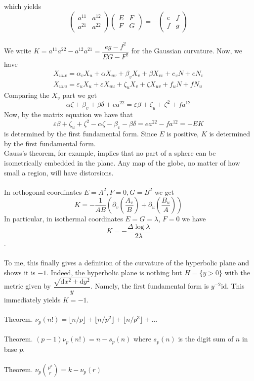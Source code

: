 \documentclass[english]{article}
\def\d{\text{d}}
\def\lap{\Delta}
\def\id{\text{id}}
\def\eps{\varepsilon}
\newcommand\floor[1]{\lfloor{#1}\rfloor}
\begin{document}
which yields
$$\left(\begin{array}{cc}
a^{11} & a^{12}\\
a^{21} & a^{22}
\end{array}\right)\left(\begin{array}{cc}
E & F\\
F & G
\end{array}\right)=-\left(\begin{array}{cc}
e & f\\
f & g
\end{array}\right)$$\\
We write $K=a^{11}a^{22}-a^{12}a^{21}=\dfrac{eg-f^2}{EG-F^2}$ for the Gaussian curvature. Now, we have
$$\begin{array}{c}
X_{uuv}=\alpha_{v}X_{u}+\alpha X_{uv}+\beta_{v}X_{v}+\beta X_{vv}+e_{v}N+eN_{v}\\
X_{uvu}=\eps_{u}X_{u}+\eps X_{uu}+\zeta_{u}X_{v}+\zeta X_{uv}+f_{u}N+fN_{u}
\end{array}$$
Comparing the $X_v$ part we get 
$$\alpha\zeta+\beta_{v}+\beta\delta+ea^{22}=\eps\beta+\zeta_{u}+\zeta^{2}+fa^{12}$$
Now, by the matrix equation we have that
$$\eps\beta+\zeta_{u}+\zeta^{2}-\alpha\zeta-\beta_{v}-\beta\delta=ea^{22}-fa^{12}=-EK$$
is determined by the first fundamental form. Since $E$ is positive, $K$ is determined by the first fundamental form.\\
Gauss's theorem, for example, implies that no part of a sphere can be isometrically embedded in the plane. Any map of the globe, no matter of how small a region, will have distorsions.
\\\\
In orthogonal coordinates $E=A^2,F=0,G=B^2$ we get $$K=-\dfrac{1}{AB}\left(\partial_{v}\left(\dfrac{A_{v}}{B}\right)+\partial_{u}\left(\dfrac{B_{u}}{A}\right)\right)$$
In particular, 
in isothermal coordinates $E=G=\lambda$, $F=0$ we have $$K=-\dfrac{\lap \log \lambda}{2\lambda}$$.
\\\\
To me, this finally gives a definition of the curvature of the hyperbolic plane and shows it is $-1$. Indeed, the hyperbolic plane is nothing but $H=\{y>0\}$ with the metric given by $\dfrac{\sqrt{\d x^2+\d y^2}}{y}$. Namely, the first fundamental form is $y^{-2}\id$. This immediately yields $K=-1$.
\\\\
Theorem. $\nu_p(n!)=\floor{n/p}+\floor{n/p^2}+\floor{n/p^3}+\dots$
\\\\
Theorem. $(p-1)\nu_p(n!)=n-s_p(n)$ where $s_p(n)$ is the digit sum of $n$ in base $p$.
\\\\
Theorem. $\nu_p{p^k\choose r}=k-\nu_p(r)$
\end{document}
